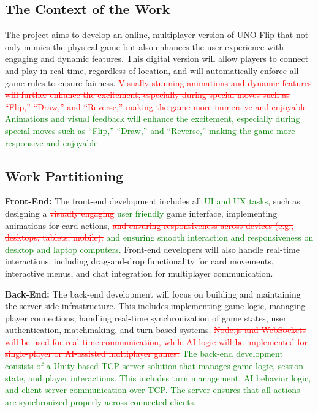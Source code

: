 \documentclass[12pt]{article}
\newcommand{\removed}[1]{\textcolor{red}{\sout{#1}}}
\newcommand{\added}[1]{\textcolor{green}{#1}}
\begin{document}
\subsection{The Context of the Work}
The project aims to develop an online, multiplayer version of UNO Flip that not only mimics the physical game but also enhances the user experience with engaging and dynamic features. This digital version will allow players to connect and play in real-time, regardless of location, and will automatically enforce all game rules to ensure fairness. \removed{Visually stunning animations and dynamic features will further enhance the excitement, especially during special moves such as “Flip,” “Draw,” and “Reverse,” making the game more immersive and enjoyable.} \added{Animations and visual feedback will enhance the excitement, especially during special moves such as “Flip,” “Draw,” and “Reverse,” making the game more responsive and enjoyable.}

\subsection{Work Partitioning}

\textbf{Front-End:} The front-end development includes all \added{UI and UX tasks}, such as designing a \removed{visually engaging} \added{user friendly} game interface, implementing animations for card actions, \removed{and ensuring responsiveness across devices (e.g., desktops, tablets, mobile).} \added{and ensuring smooth interaction and responsiveness on desktop and laptop computers.} Front-end developers will also handle real-time interactions, including drag-and-drop functionality for card movements, interactive menus, and chat integration for multiplayer communication.

\textbf{Back-End:} The back-end development will focus on building and maintaining the server-side infrastructure. This includes implementing game logic, managing player connections, handling real-time synchronization of game states, user authentication, matchmaking, and turn-based systems. \removed{Node.js and WebSockets will be used for real-time communication, while AI logic will be implemented for single-player or AI-assisted multiplayer games.} \added{The back-end development consists of a Unity-based TCP server solution that manages game logic, session state, and player interactions. This includes turn management, AI behavior logic, and client-server communication over TCP. The server ensures that all actions are synchronized properly across connected clients.}
\end{document}
